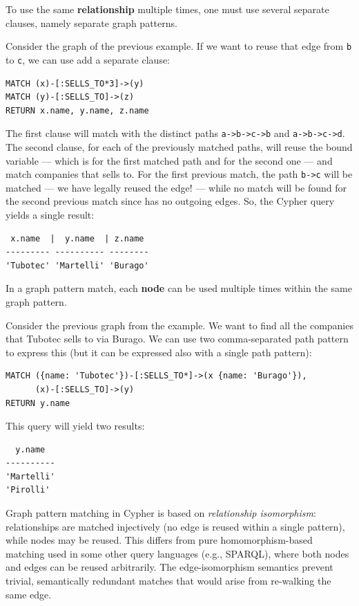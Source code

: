 \noindent
To use the same \textbf{relationship} multiple times, one must use several separate  clauses, namely separate graph patterns.

\begin{example}{}
    Consider the graph of the previous example.
    If we want to reuse that edge from \texttt{b} to \texttt{c}, we can use add a separate  clause:
    \begin{lstlisting}
MATCH (x)-[:SELLS_TO*3]->(y)
MATCH (y)-[:SELLS_TO]->(z)
RETURN x.name, y.name, z.name
    \end{lstlisting}
    The first  clause will match with the distinct paths \texttt{a->b->c->b} and \texttt{a->b->c->d}.
    The second  clause, for each of the previously matched paths, will reuse the bound  variable --- which is  for the first matched path and  for the second one --- and match companies that  sells to.
    For the first previous match, the path \texttt{b->c} will be matched --- we have legally reused the edge! --- while no match will be found for the second previous match since  has no outgoing edges.
    So, the Cypher query yields a single result:
    \begin{lstlisting}
 x.name  |  y.name  | z.name
--------- ---------- --------
'Tubotec' 'Martelli' 'Burago'
    \end{lstlisting}
\end{example}

\noindent
In a graph pattern match, each \textbf{node} can be used multiple times within the same graph pattern.

\begin{example}{}
    Consider the previous graph from the example.
    We want to find all the companies that Tubotec sells to via Burago. We can use two comma-separated path pattern to express this (but it can be expressed also with a single path pattern):
    \begin{lstlisting}
MATCH ({name: 'Tubotec'})-[:SELLS_TO*]->(x {name: 'Burago'}),
      (x)-[:SELLS_TO]->(y)
RETURN y.name
    \end{lstlisting}
    This query will yield two results:
    \begin{lstlisting}
  y.name
----------
'Martelli'
'Pirolli'
    \end{lstlisting}
\end{example}

\begin{note}{}
    Graph pattern matching in Cypher is based on \emph{relationship isomorphism}: relationships are matched injectively (no edge is reused within a single pattern), while nodes may be reused. This differs from pure homomorphism-based matching used in some other query languages (e.g., SPARQL), where both nodes and edges can be reused arbitrarily. The edge-isomorphism semantics prevent trivial, semantically redundant matches that would arise from re-walking the same edge.
\end{note}

